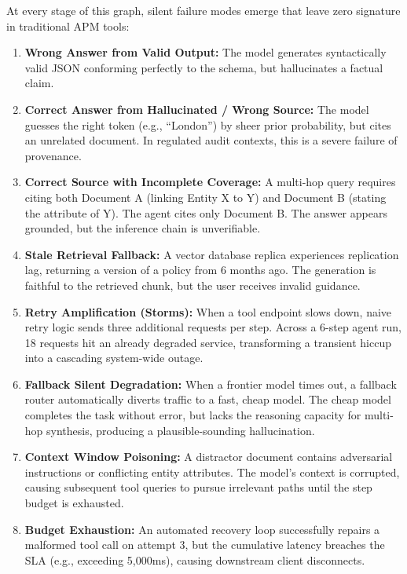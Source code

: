 At every stage of this graph, silent failure modes emerge that leave zero signature in traditional APM tools:
\begin{enumerate}
    \item \textbf{Wrong Answer from Valid Output:} The model generates syntactically valid JSON conforming perfectly to the schema, but hallucinates a factual claim.
    \item \textbf{Correct Answer from Hallucinated / Wrong Source:} The model guesses the right token (e.g., ``London'') by sheer prior probability, but cites an unrelated document. In regulated audit contexts, this is a severe failure of provenance.
    \item \textbf{Correct Source with Incomplete Coverage:} A multi-hop query requires citing both Document A (linking Entity X to Y) and Document B (stating the attribute of Y). The agent cites only Document B. The answer appears grounded, but the inference chain is unverifiable.
    \item \textbf{Stale Retrieval Fallback:} A vector database replica experiences replication lag, returning a version of a policy from 6 months ago. The generation is faithful to the retrieved chunk, but the user receives invalid guidance.
    \item \textbf{Retry Amplification (Storms):} When a tool endpoint slows down, naive retry logic sends three additional requests per step. Across a 6-step agent run, 18 requests hit an already degraded service, transforming a transient hiccup into a cascading system-wide outage.
    \item \textbf{Fallback Silent Degradation:} When a frontier model times out, a fallback router automatically diverts traffic to a fast, cheap model. The cheap model completes the task without error, but lacks the reasoning capacity for multi-hop synthesis, producing a plausible-sounding hallucination.
    \item \textbf{Context Window Poisoning:} A distractor document contains adversarial instructions or conflicting entity attributes. The model's context is corrupted, causing subsequent tool queries to pursue irrelevant paths until the step budget is exhausted.
    \item \textbf{Budget Exhaustion:} An automated recovery loop successfully repairs a malformed tool call on attempt 3, but the cumulative latency breaches the SLA (e.g., exceeding 5,000ms), causing downstream client disconnects.
\end{enumerate}

